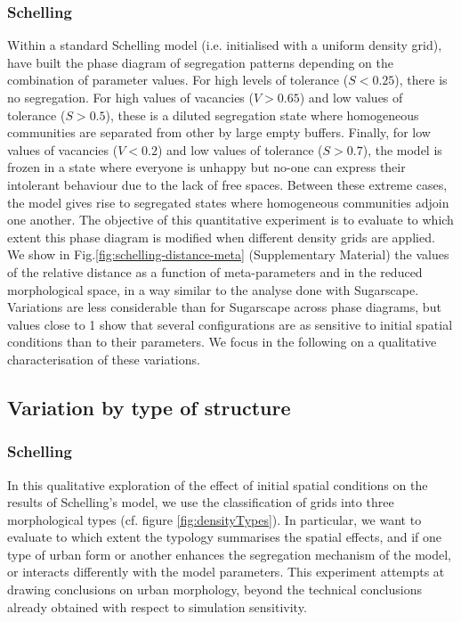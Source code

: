 \documentclass{JASSS}
\begin{document}
\subsubsection{Schelling} 
Within a standard Schelling model (i.e. initialised with a uniform density grid), \citet{Gauvinetal2009} have built the phase diagram of segregation patterns depending on the combination of parameter values. For high levels of tolerance ($S < 0.25$), there is no segregation. For high values of vacancies ($V > 0.65$) and low values of tolerance ($S > 0.5$), these is a diluted segregation state where homogeneous communities are separated from other by large empty buffers. Finally, for low values of vacancies ($V < 0.2$) and low values of tolerance ($S > 0.7$), the model is frozen in a state where everyone is unhappy but no-one can express their intolerant behaviour due to the lack of free spaces. Between these extreme cases, the model gives rise to segregated states where homogeneous communities adjoin one another. The objective of this quantitative experiment is to evaluate to which extent this phase diagram is modified when different density grids are applied. We show in Fig.\ref{fig:schelling-distance-meta} (Supplementary Material) the values of the relative distance as a function of meta-parameters and in the reduced morphological space, in a way similar to the analyse done with Sugarscape. Variations are less considerable than for Sugarscape across phase diagrams, but values close to 1 show that several configurations are as sensitive to initial spatial conditions than to their parameters. We focus in the following on a qualitative characterisation of these variations.

\subsection{Variation by type of structure}
\label{sec:qualResults}

\subsubsection{Schelling}

In this qualitative exploration of the effect of initial spatial conditions on the results of Schelling's model, we use the classification of grids into three morphological types (cf. figure \ref{fig:densityTypes}). In particular, we want to evaluate to which extent the typology summarises the spatial effects, and if one type of urban form or another enhances the segregation mechanism of the model, or interacts differently with the model parameters. This experiment attempts at drawing conclusions on urban morphology, beyond the technical conclusions already obtained with respect to simulation sensitivity.
\end{document}
